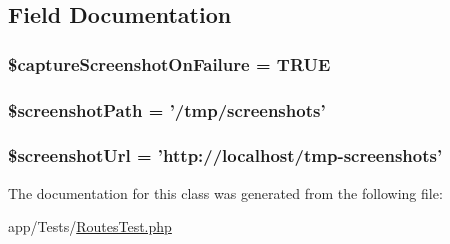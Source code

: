 \subsection{Field Documentation}
\hypertarget{class_web_test_a756f07b98e02a745606a1124b6e84bd3}{
\subsubsection[{\$capture\-Screenshot\-On\-Failure}]{\setlength{\rightskip}{0pt plus 5cm}\$capture\-Screenshot\-On\-Failure = T\-R\-U\-E\hspace{0.3cm}{\ttfamily [protected]}}}\label{class_web_test_a756f07b98e02a745606a1124b6e84bd3}
\hypertarget{class_web_test_a5f5fb181a26429e78d39346b9cdfa490}{
\subsubsection[{\$screenshot\-Path}]{\setlength{\rightskip}{0pt plus 5cm}\$screenshot\-Path = '/tmp/screenshots'\hspace{0.3cm}{\ttfamily [protected]}}}\label{class_web_test_a5f5fb181a26429e78d39346b9cdfa490}
\hypertarget{class_web_test_ae04f7762cbc157459ef1ae22041b260f}{
\subsubsection[{\$screenshot\-Url}]{\setlength{\rightskip}{0pt plus 5cm}\$screenshot\-Url = 'http\-://localhost/tmp-\/screenshots'\hspace{0.3cm}{\ttfamily [protected]}}}\label{class_web_test_ae04f7762cbc157459ef1ae22041b260f}


The documentation for this class was generated from the following file\-:\begin{DoxyCompactItemize}
\item 
app/\-Tests/\hyperlink{_routes_test_8php}{Routes\-Test.\-php}\end{DoxyCompactItemize}
